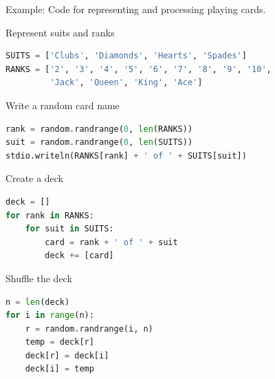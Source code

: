 \documentclass[8pt,a4paper,compress]{beamer}
\begin{document}
\begin{frame}[fragile]
\pause

\begin{framed}
\tiny Example: Code for representing and processing playing cards.
\end{framed}

\pause

Represent suits and ranks

\smallskip

\begin{lstlisting}[language=Python,style=focusin]
SUITS = ['Clubs', 'Diamonds', 'Hearts', 'Spades']
RANKS = ['2', '3', '4', '5', '6', '7', '8', '9', '10', 
         'Jack', 'Queen', 'King', 'Ace']
\end{lstlisting}

\pause\bigskip

Write a random card name

\smallskip

\begin{lstlisting}[language=Python,style=focusin]
rank = random.randrange(0, len(RANKS))
suit = random.randrange(0, len(SUITS))
stdio.writeln(RANKS[rank] + ' of ' + SUITS[suit])
\end{lstlisting}

\pause\bigskip

Create a deck

\smallskip

\begin{lstlisting}[language=Python,style=focusin]
deck = []
for rank in RANKS:
    for suit in SUITS:
        card = rank + ' of ' + suit
        deck += [card]
\end{lstlisting}

\pause\bigskip

Shuffle the deck

\smallskip

\begin{lstlisting}[language=Python,style=focusin]
n = len(deck)
for i in range(n):
    r = random.randrange(i, n)
    temp = deck[r]
    deck[r] = deck[i]
    deck[i] = temp
\end{lstlisting}
\end{frame}
\end{document}
